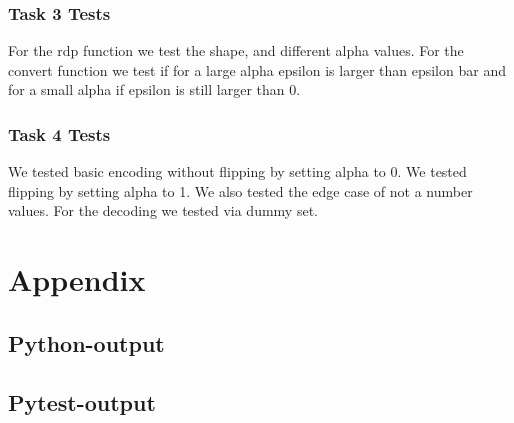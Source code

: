 \documentclass{article}
\begin{document}
		\subsubsection{Task 3 Tests}
			For the rdp function we test the shape, and different alpha values.
			For the convert function we test if for a large alpha epsilon is larger than epsilon bar and for a small alpha if epsilon is still larger than 0.
		\subsubsection{Task 4 Tests}
		We tested basic encoding without flipping by setting alpha to 0. We tested flipping by setting alpha to 1. We also tested the edge case of not a number values. For the decoding we tested via dummy set.
	
		\section{Appendix}
			\subsection{Python-output}\label{lst:python-output}
				
			\subsection{Pytest-output}
				\label{lst:pytest-output}
\end{document}
